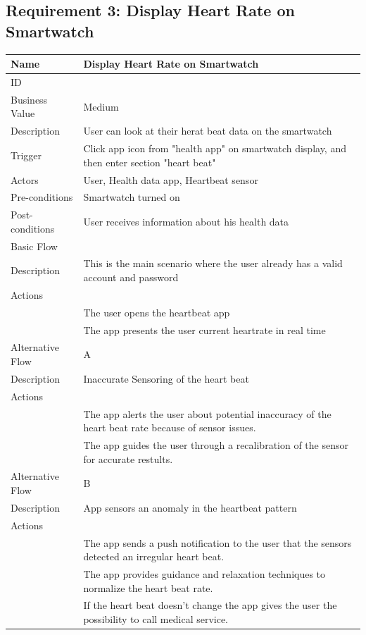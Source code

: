 \documentclass{article}
\begin{document}
\subsection{Requirement 3: Display Heart Rate on Smartwatch}
	\begin{center}
		\begin{tabularx}{1.0\textwidth}{|>{\raggedright\arraybackslash}p{}|>{\raggedright\arraybackslash}X|}
			\hline
			Name             & Display Heart Rate on Smartwatch \\ \hline
			ID               & 3 \\ \hline
			Business Value   & Medium \\ \hline
			Description      & User can look at their herat beat data on the smartwatch \\ \hline
			Trigger          & Click app icon from "health app" on smartwatch display, and then enter section "heart beat" \\ \hline
			Actors           & User, Health data app, Heartbeat sensor \\ \hline
			Pre-conditions   & Smartwatch turned on \\ \hline
			Post-conditions  & User receives information about his health data \\ \hline
			Basic Flow       & \\ \hline
							Description & This is the main scenario where the user already has a valid account and password \\ \hline
							Actions & \\ \hline
							1 & The user opens the heartbeat app \\ \hline
							2 & The app presents the user current heartrate in real time \\ \hline
			Alternative Flow & A \\ \hline
							Description & Inaccurate Sensoring of the heart beat \\ \hline
							Actions & \\ \hline
							1 & The app alerts the user about potential inaccuracy of the heart beat rate because of sensor issues. \\ \hline
							2 & The app guides the user through a recalibration of the sensor for accurate restults.  \\ \hline
			Alternative Flow & B \\ \hline
							Description & App sensors an anomaly in the heartbeat pattern  \\ \hline
							Actions & \\ \hline
							1 & The app sends a push notification to the user that the sensors detected an irregular heart beat. \\ \hline
							2 & The app provides guidance and relaxation techniques to normalize the heart beat rate. \\ \hline
							3 & If the heart beat doesn't change the app gives the user the possibility to call medical service. \\ \hline
		\end{tabularx}
	\end{center}
\end{document}
